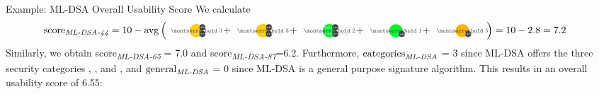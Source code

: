 \documentclass[11pt,english,a4paper, landscape]{scrartcl}
\begin{document}
\vspace{-2mm}
   	\begin{algorithmbox}{Example: ML-DSA Overall Usability Score}
		\tiny
		We calculate
		\vspace{-2mm}
		\begin{align*}
			\textnormal{score\textsubscript{\itshape ML-DSA-44}} &= 10 - \avg\left({\scriptsize
			\tripleicon{\montserratbold 3}{\faMicrochip}{themeyellow}{0.6}{\faKey}\hspace{-2mm} + %
			\tripleicon{\montserratbold 3}{\faMicrochip}{themeyellow}{0.6}{\faPen}\hspace{-2mm} + %
			\tripleicon{\montserratbold 2}{\faMicrochip}{themegreen}{0.6}{\faQuestionCircle}\hspace{-2mm} + %
			\doubleicon{\montserratbold 1}{\faPen}{themegreen}{0.6}\hspace{-2mm} + %
			\doubleicon{\montserratbold 5}{\faKey}{themeorange}{0.6}\hspace{-2mm}
			}\right) = 10 - 2.8 = 7.2
		\end{align*}
		Similarly, we obtain \textnormal{score\textsubscript{\itshape ML-DSA-65}} = 7.0 and \textnormal{score\textsubscript{\itshape ML-DSA-87}}=6.2. Furthermore, $\textnormal{categories}_\textnormal{\itshape ML-DSA}$ = 3 since ML-DSA offers the three security categories \hspace{-2mm}, \hspace{-2mm}, and \hspace{-2mm}, and $\textnormal{general}_\textnormal{\itshape ML-DSA}$ = 0 since ML-DSA is a general purpose signature algorithm. This results in an overall usability score of 6.55:\\[\baselineskip]


\end{algorithmbox}
\end{document}
